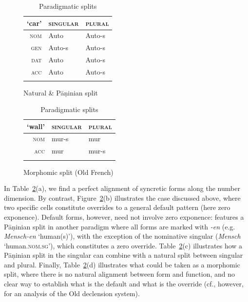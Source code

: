 \documentclass[output=paper
	        ,collection
	        ,collectionchapter
 	        ,biblatex
                ,babelshorthands
                ,newtxmath
                ,draftmode
                ,colorlinks, citecolor=brown
]{langscibook}
\begin{document}
\begin{table}[htb]
\begin{subfigure}{.45\textwidth}
    \begin{tabular}{r|ll}
        \lsptoprule
        `car' & \textsc{singular} & \textsc{plural}\\
        \midrule
        \textsc{nom} & Auto & Auto-s\\
        \textsc{gen} & Auto-s & Auto-s\\
        \textsc{dat} & Auto & Auto-s\\
        \textsc{acc} & Auto & Auto-s\\
        \lspbottomrule
      \end{tabular}
      \caption{Natural \& Pāṇinian split}
    \end{subfigure}
  \begin{subfigure}{.50\textwidth}

    \centering
    \begin{tabular}{r|ll}
      \lsptoprule
      `wall' & \textsc{singular} & \textsc{plural}\\
      \midrule
      \textsc{nom} & mur-s & mur\\
      \textsc{acc} & mur & mur-s\\
      \lspbottomrule
    \end{tabular}

    \caption{Morphomic split (Old French)}
  \end{subfigure}
  
  
  \caption{Paradigmatic splits}
  \label{tab:ParaSplit}
\end{table}

In Table~\ref{tab:ParaSplit}(a), we find a perfect alignment of
syncretic forms along the number dimension. By contrast,
Figure~\ref{tab:ParaSplit}(b) illustrates the case discussed above,
where two specific cells constitute overrides to a general default
pattern (here zero exponence). Default forms, however, need not
involve zero exponence:  features a Pāṇinian split in another
paradigm where all forms are marked with \textit{-en}
(e.g. \textit{Mensch-en} `human(s)'), with the exception of the
nominative singular (\textit{Mensch} `human\textsc{.nom.sg}'), which
constitutes a zero override. Table~\ref{tab:ParaSplit}(c) illustrates
how a Pāṇinian split in the singular can combine with a natural split
between singular and plural. Finally, Table~\ref{tab:ParaSplit}(d)
illustrates what could be taken as a morphomic split, where there is no
natural alignment between form and function, and no clear way to
establish what is the default and what is the override (cf., however,
\citealt{Crysmann:Kihm:2018} for an analysis of the Old 
declension system).
\end{document}
